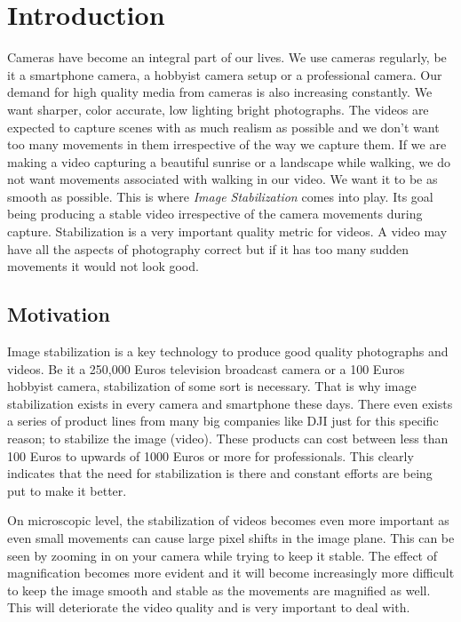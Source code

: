 \chapter{Introduction} \label{chapter_one}

Cameras have become an integral part of our lives. We use cameras regularly, be it a smartphone camera, a hobbyist camera setup or a professional camera. Our demand for high quality media from cameras is also increasing constantly. We want sharper, color accurate, low lighting bright photographs. The videos are expected to capture scenes with as much realism as possible and we don't want too many movements in them irrespective of the way we capture them. If we are making a video capturing a beautiful sunrise or a landscape while walking, we do not want movements associated with walking in our video. We want it to be as smooth as possible. This is where \textit{Image Stabilization} comes into play. Its goal being producing a stable video irrespective of the camera movements during capture. Stabilization is a very important quality metric for videos. A video may have all the aspects of photography correct but if it has too many sudden movements it would not look good.

\section{Motivation}

Image stabilization is a key technology to produce  good quality photographs and videos. Be it a 250,000 Euros television broadcast camera or a 100 Euros hobbyist camera, stabilization of some sort is necessary. That is why image stabilization exists in every camera and smartphone these days. There even exists a series of product lines from many big companies like DJI just for this specific reason; to stabilize the image (video). These products can cost between less than 100 Euros to upwards of 1000 Euros or more for professionals. This clearly indicates that the need for stabilization is there and constant efforts are being put to make it better.

On microscopic level, the stabilization of videos becomes even more important as even small movements can cause large pixel shifts in the image plane. This can be seen by zooming in on your camera while trying to keep it stable. The effect of magnification becomes more evident and it will become increasingly more difficult to keep the image smooth and stable as the movements are magnified as well. This will deteriorate the video quality and is very important to deal with. 


